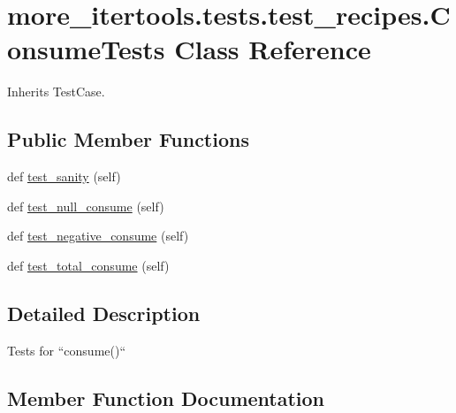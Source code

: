 \hypertarget{classmore__itertools_1_1tests_1_1test__recipes_1_1_consume_tests}{}\section{more\+\_\+itertools.\+tests.\+test\+\_\+recipes.\+Consume\+Tests Class Reference}
\label{classmore__itertools_1_1tests_1_1test__recipes_1_1_consume_tests}


Inherits Test\+Case.

\subsection*{Public Member Functions}
\begin{DoxyCompactItemize}
\item 
def \hyperlink{classmore__itertools_1_1tests_1_1test__recipes_1_1_consume_tests_a122f3bd3697cd7d8fa94c712828295f0}{test\+\_\+sanity} (self)
\item 
def \hyperlink{classmore__itertools_1_1tests_1_1test__recipes_1_1_consume_tests_a3f3ac6cd5dcfc675c99e0b60c5873ddb}{test\+\_\+null\+\_\+consume} (self)
\item 
def \hyperlink{classmore__itertools_1_1tests_1_1test__recipes_1_1_consume_tests_aaff65d60770a3e39875430a26e514a11}{test\+\_\+negative\+\_\+consume} (self)
\item 
def \hyperlink{classmore__itertools_1_1tests_1_1test__recipes_1_1_consume_tests_a7d7cecd36e3d3e31a99afe29ba41ff35}{test\+\_\+total\+\_\+consume} (self)
\end{DoxyCompactItemize}


\subsection{Detailed Description}
\begin{DoxyVerb}Tests for ``consume()``\end{DoxyVerb}
 

\subsection{Member Function Documentation}
\mbox{\label{classmore__itertools_1_1tests_1_1test__recipes_1_1_consume_tests_aaff65d60770a3e39875430a26e514a11}} 
